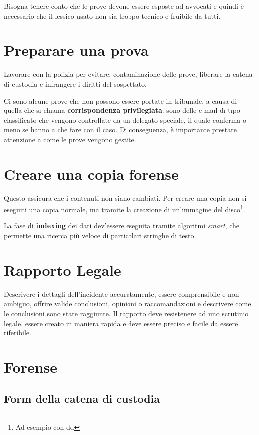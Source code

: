 Bisogna tenere conto che le prove devono essere esposte ad avvocati
e quindi è necessario che il lessico usato non sia troppo tecnico e fruibile da tutti.

\section{Preparare una prova}

Lavorare con la polizia per evitare: contaminazione delle prove, liberare la 
catena di custodia e infrangere i diritti del sospettato.

Ci sono alcune prove che non possono essere portate in tribunale, a causa di
quella che si chiama \textbf{corrispondenza privilegiata}: sono delle e-mail
di tipo classificato che vengono controllate da un delegato speciale, il quale 
conferma o meno se hanno a che fare con il caso. Di conseguenza, è importante 
prestare attenzione a come le prove vengono gestite.

\section{Creare una copia forense}

Questo assicura che i contenuti non siano cambiati. Per creare una copia non si
 eseguiti una copia normale, ma tramite la creazione di
un'immagine del disco\footnote{Ad esempio con dd}.

La fase di \textbf{indexing} dei dati dev'essere eseguita tramite algoritmi
\textit{smart}, che permette una ricerca più veloce di particolari stringhe di
testo.

\section{Rapporto Legale}

Descrivere i dettagli dell'incidente accuratamente, essere comprensibile e non
ambiguo, offrire valide conclusioni, opinioni o raccomandazioni e descrivere come
le conclusioni sono state raggiunte. Il rapporto deve resistenere ad uno scrutinio 
legale, essere creato in maniera rapida e deve essere preciso e facile da essere 
riferibile.

\section{Forense}

\subsection{Form della catena di custodia}

